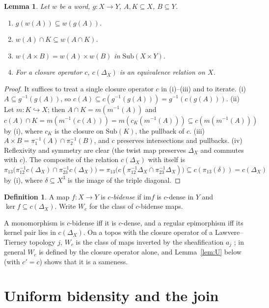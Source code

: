 \documentclass[11pt]{amsart}
\newtheorem{lem}[thm]{Lemma}
\theoremstyle{definition}
\newtheorem{defi}[thm]{Definition}
\newcommand{\im}{\mathrm{im}}
\newcommand{\Sub}{\mathrm{Sub}}
\begin{document}
\begin{lem}\label{lem:calc}
Let $w$ be a word, $g\colon X\to Y$, $A,K\subseteq X$, $B\subseteq Y$.
\begin{enumerate}
\item[(i)] $g(w(A))\subseteq w(g(A))$.
\item[(ii)] $w(A)\cap K\subseteq w(A\cap K)$.
\item[(iii)] $w(A\times B)=w(A)\times w(B)$ in $\Sub(X\times Y)$.
\item[(iv)] For a closure operator $c$, $c(\Delta_X)$ is an equivalence
relation on $X$.
\end{enumerate}
\end{lem}
\begin{proof}
It suffices to treat a single closure operator $c$ in (i)--(iii) and to
iterate. (i) $A\subseteq g^{-1}(g(A))$, so $c(A)\subseteq c(g^{-1}(g(A)))=
g^{-1}(c(g(A)))$. (ii) Let $m\colon K\hookrightarrow X$; then $A\cap K=
m(m^{-1}(A))$ and $c(A)\cap K=m(m^{-1}(c(A)))=m(c_K(m^{-1}(A)))\subseteq
c(m(m^{-1}(A)))$ by (i), where $c_K$ is the closure on $\Sub(K)$, the
pullback of $c$. (iii) $A\times B=\pi_1^{-1}(A)\cap\pi_2^{-1}(B)$, and $c$
preserves intersections and pullbacks. (iv) Reflexivity and symmetry are
clear (the twist map preserves $\Delta_X$ and commutes with $c$). The
composite of the relation $c(\Delta_X)$ with itself is
$\pi_{13}\bigl(\pi_{12}^{-1}c(\Delta_X)\cap\pi_{23}^{-1}c(\Delta_X)\bigr)=
\pi_{13}\bigl(c(\pi_{12}^{-1}\Delta_X\cap\pi_{23}^{-1}\Delta_X)\bigr)\subseteq
c(\pi_{13}(\delta))=c(\Delta_X)$ by (i), where $\delta\subseteq X^3$ is the
image of the triple diagonal.
\end{proof}

\begin{defi}
A map $f\colon X\to Y$ is \emph{$c$-bidense} if $\im f$ is $c$-dense in $Y$
and $\ker f\subseteq c(\Delta_X)$. Write $W_c$ for the class of $c$-bidense
maps.
\end{defi}

A monomorphism is $c$-bidense iff it is $c$-dense, and a regular
epimorphism iff its kernel pair lies in $c(\Delta_X)$. On a topos with the
closure operator of a Lawvere--Tierney topology $j$, $W_c$ is the class of
maps inverted by the sheafification $a_j$ \cite[A4.3]{Elephant}; in general
$W_c$ is defined by the closure operator alone, and Lemma~\ref{lem:U}
below (with $c'=c$) shows that it is a sameness.

\section{Uniform bidensity and the join}\label{sec:uniform}
\end{document}

